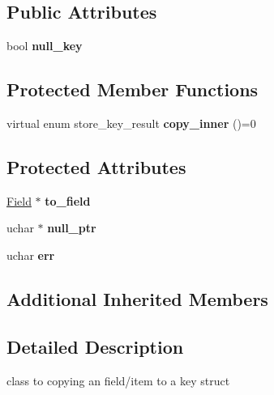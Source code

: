 \subsection*{Public Attributes}
\begin{DoxyCompactItemize}
\item 
\mbox{\label{classstore__key_a8b3ef308055ac00b14d554b814dae48d}} 
bool {\bfseries null\+\_\+key}
\end{DoxyCompactItemize}
\subsection*{Protected Member Functions}
\begin{DoxyCompactItemize}
\item 
\mbox{\label{classstore__key_a72a836c14b2b1c4d23b102d9ab364771}} 
virtual enum store\+\_\+key\+\_\+result {\bfseries copy\+\_\+inner} ()=0
\end{DoxyCompactItemize}
\subsection*{Protected Attributes}
\begin{DoxyCompactItemize}
\item 
\mbox{\label{classstore__key_a2d5e9db5322a5227c8e1649f8e5c19c6}} 
\mbox{\hyperlink{classField}{Field}} $\ast$ {\bfseries to\+\_\+field}
\item 
\mbox{\label{classstore__key_ac8e938dc9fdd8d0a44614d2c90927722}} 
uchar $\ast$ {\bfseries null\+\_\+ptr}
\item 
\mbox{\label{classstore__key_a602fe0f2c3a67c453d328030c977c583}} 
uchar {\bfseries err}
\end{DoxyCompactItemize}
\subsection*{Additional Inherited Members}


\subsection{Detailed Description}
class to copying an field/item to a key struct 

